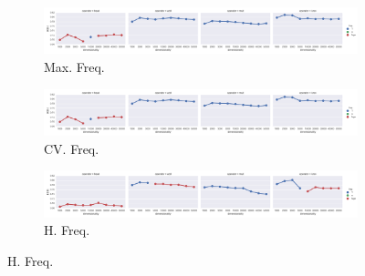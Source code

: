 


\begin{landscape}
\thispagestyle{empty} %

\begin{figure}
  \centering

  \begin{subfigure}[t]{0.49\textwidth}
    \includegraphics[width=\textwidth]{supplement/figures/KS14-max_-selection-freq}
    \caption{Max. Freq.}
    \label{fig:}
  \end{subfigure}
  \begin{subfigure}[t]{0.49\textwidth}
    \includegraphics[width=\textwidth]{supplement/figures/KS14-cross_validation-selection-freq}
    \caption{CV. Freq.}
    \label{fig:}
  \end{subfigure}
  \begin{subfigure}[t]{0.49\textwidth}
    \includegraphics[width=\textwidth]{supplement/figures/KS14-heuristics-selection-freq}
    \caption{H. Freq.}
    \label{fig:}
  \end{subfigure}


\end{figure}
\end{landscape}
